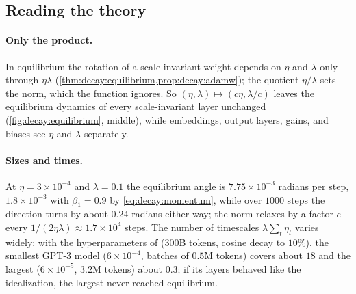 \begin{refsection}
\section{Reading the theory}\label{sec:decay:reading}

\paragraph{Only the product.} In equilibrium the rotation of a scale-invariant weight depends on $\eta$ and $\lambda$ only through $\eta\lambda$ (\cref{thm:decay:equilibrium,prop:decay:adamw}); the quotient $\eta/\lambda$ sets the norm, which the function ignores. So $(\eta,\lambda)\mapsto(c\eta,\lambda/c)$ leaves the equilibrium dynamics of every scale-invariant layer unchanged (\cref{fig:decay:equilibrium}, middle), while embeddings, output layers, gains, and biases see $\eta$ and $\lambda$ separately.

\paragraph{Sizes and times.} At $\eta=3\times10^{-4}$ and $\lambda=0.1$ the equilibrium angle is $7.75\times10^{-3}$ radians per step, $1.8\times10^{-3}$ with $\beta_1=0.9$ by \eqref{eq:decay:momentum}, while over $1000$ steps the direction turns by about $0.24$ radians either way; the norm relaxes by a factor $e$ every $1/(2\eta\lambda)\approx1.7\times10^4$ steps. The number of timescales $\lambda\sum_t\eta_t$ varies widely: with the hyperparameters of \textcite{BrownEtAl2020} ($300$B tokens, cosine decay to $10\%$), the smallest GPT-3 model ($6\times10^{-4}$, batches of $0.5$M tokens) covers about $18$ and the largest ($6\times10^{-5}$, $3.2$M tokens) about $0.3$; if its layers behaved like the idealization, the largest never reached equilibrium.


\end{refsection}
